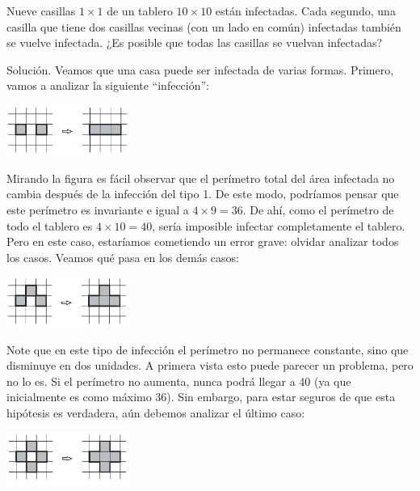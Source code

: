 \documentclass[11pt]{scrartcl}
\begin{document}
\begin{example}
Nueve casillas \(1 \times 1\) de un tablero \(10 \times 10\) están infectadas. Cada segundo, una casilla que tiene dos casillas vecinas (con un lado en común) infectadas también se vuelve infectada. ¿Es posible que todas las casillas se vuelvan infectadas?
\end{example}

Solución. Veamos que una casa puede ser infectada de varias formas. Primero, vamos a analizar la siguiente ``infección'':

\begin{center}
\includegraphics[width=0.3\textwidth]{images/clase_12_infeccion_tipo1.png}
\end{center}

Mirando la figura es fácil observar que el perímetro total del área infectada no cambia después de la infección del tipo 1. De este modo, podríamos pensar que este perímetro es invariante e igual a \(4 \times 9 = 36\). De ahí, como el perímetro de todo el tablero es \(4 \times 10 = 40\), sería imposible infectar completamente el tablero. Pero en este caso, estaríamos cometiendo un error grave: olvidar analizar todos los casos. Veamos qué pasa en los demás casos:

\begin{center}
\includegraphics[width=0.3\textwidth]{images/clase_12_infeccion_tipo2.png}
\end{center}

Note que en este tipo de infección el perímetro no permanece constante, sino que disminuye en dos unidades. A primera vista esto puede parecer un problema, pero no lo es. Si el perímetro no aumenta, nunca podrá llegar a 40 (ya que inicialmente es como máximo 36). Sin embargo, para estar seguros de que esta hipótesis es verdadera, aún debemos analizar el último caso:

\begin{center}
\includegraphics[width=0.3\textwidth]{images/clase_12_infeccion_tipo3.png}
\end{center}
\end{document}
